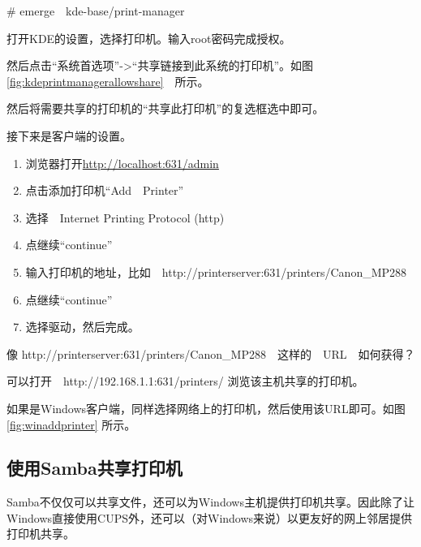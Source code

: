 \begin{code}
\# emerge　kde-base/print-manager
\end{code}

打开KDE的设置，选择打印机。输入root密码完成授权。


然后点击“系统首选项”->“共享链接到此系统的打印机”。如图 \ref{fig:kdeprintmanagerallowshare}　所示。


然后将需要共享的打印机的“共享此打印机”的复选框选中即可。

接下来是客户端的设置。

\begin{enumerate}
\item{}浏览器打开\url{http://localhost:631/admin}

\item    点击添加打印机“Add　Printer”
\item    选择　Internet Printing Protocol (http) 
\item   点继续“continue”
\item   输入打印机的地址，比如　http://printerserver:631/printers/Canon\_MP288
\item   点继续“continue”
\item   选择驱动，然后完成。
\end{enumerate}

\begin{notice}
像 http://printerserver:631/printers/Canon\_MP288　这样的　URL　如何获得？

可以打开　http://192.168.1.1:631/printers/ 浏览该主机共享的打印机。
\end{notice}

如果是Windows客户端，同样选择网络上的打印机，然后使用该URL即可。如图 \ref{fig:winaddprinter} 所示。


\subsection{使用Samba共享打印机}

Samba不仅仅可以共享文件，还可以为Windows主机提供打印机共享。因此除了让Windows直接使用CUPS外，还可以（对Windows来说）以更友好的网上邻居提供打印机共享。

